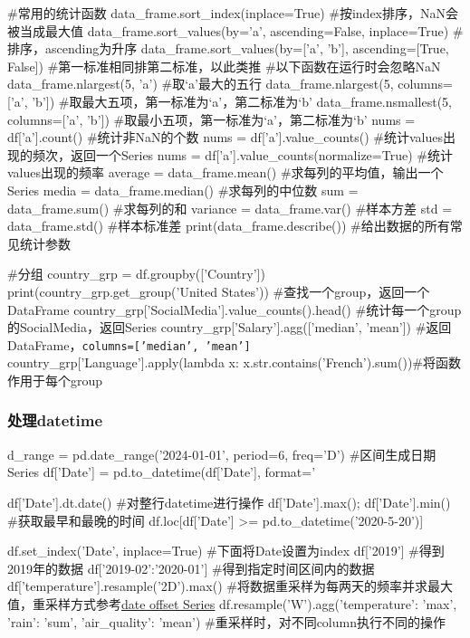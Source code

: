 \begin{codeblock}[language=python, caption={Perform statistical operations using DataFrame}]
        #常用的统计函数
        data_frame.sort_index(inplace=True) #按index排序，NaN会被当成最大值
        data_frame.sort_values(by='a', ascending=False, inplace=True) #排序，ascending为升序
        data_frame.sort_values(by=['a', 'b'], ascending=[True, False]) #第一标准相同排第二标准，以此类推
        #以下函数在运行时会忽略NaN
        data_frame.nlargest(5, 'a') #取`a'最大的五行
        data_frame.nlargest(5, columns=['a', 'b']) #取最大五项，第一标准为`a'，第二标准为`b'
        data_frame.nsmallest(5, columns=['a', 'b']) #取最小五项，第一标准为`a'，第二标准为`b'
        nums = df['a'].count() #统计非NaN的个数
        nums = df['a'].value_counts() #统计values出现的频次，返回一个Series
        nums = df['a'].value_counts(normalize=True) #统计values出现的频率
        average = data_frame.mean() #求每列的平均值，输出一个Series
        media = data_frame.median() #求每列的中位数
        sum = data_frame.sum() #求每列的和
        variance = data_frame.var() #样本方差
        std = data_frame.std() #样本标准差
        print(data_frame.describe()) #给出数据的所有常见统计参数

        #分组
        country_grp = df.groupby(['Country'])
        print(country_grp.get_group('United States')) #查找一个group，返回一个DataFrame
        country_grp['SocialMedia'].value_counts().head() #统计每一个group的SocialMedia，返回Series
        country_grp['Salary'].agg(['median', 'mean']) #返回DataFrame，\texttt{columns=['median', 'mean']}
        country_grp['Language'].apply(lambda x: x.str.contains('French').sum())#将函数作用于每个group
      \end{codeblock}

    \subsubsection{处理datetime}
      \begin{codeblock}[language=python, caption={datetime in pandas}]
        d_range = pd.date_range('2024-01-01', period=6, freq='D') #区间生成日期Series
        df['Date'] = pd.to_datetime(df['Date'], format='%

        df['Date'].dt.date() #对整行datetime进行操作
        df['Date'].max(); df['Date'].min() #获取最早和最晚的时间
        df.loc[df['Date'] >= pd.to_datetime('2020-5-20')]

        df.set_index('Date', inplace=True) #下面将Date设置为index
        df['2019'] #得到2019年的数据
        df['2019-02':'2020-01'] #得到指定时间区间内的数据
        df['temperature'].resample('2D').max() 
            #将数据重采样为每两天的频率并求最大值，重采样方式参考\href{https://pandas.pydata.org/docs/user_guide/timeseries.html\#dateoffset-objects}{\underline{{date offset Series}}}
        df.resample('W').agg({'temperature': 'max', 'rain': 'sum', 'air_quality': 'mean'}) 
            #重采样时，对不同column执行不同的操作
      \end{codeblock}

